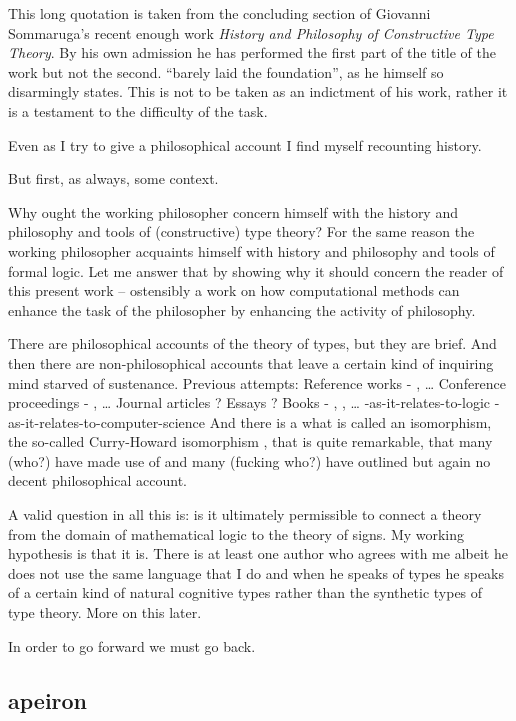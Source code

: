 \documentclass[dah,phd,a4paper]{xe_uccthesis}
\newcommand{\work}[1] {\textit{#1}}
\begin{document}
This long quotation is taken from the concluding section of Giovanni Sommaruga's recent enough work \work{History and Philosophy of Constructive Type Theory}. By his own admission he has performed the first part of the title of the work but not the second. “barely laid the foundation”, as he himself so disarmingly states. This is not to be taken as an indictment of his work, rather it is a testament to the difficulty of the task.

Even as I try to give a philosophical account I find myself recounting history.

But first, as always, some context.

Why ought the working philosopher concern himself with the history and philosophy and tools of (constructive) type theory? For the same reason the working philosopher acquaints himself with history and philosophy and tools of formal logic. Let me answer that by showing why it should concern the reader of this present work – ostensibly a work on how computational methods can enhance the task of the philosopher by enhancing the activity of philosophy.

There are philosophical accounts of the theory of types, but they are brief. And then there are non-philosophical accounts that leave a certain kind of inquiring mind starved of sustenance.
Previous attempts:
Reference works - \citep{coquand_type_2015}, …
Conference proceedings - \citep{martin-lof_hilbert-brouwer_2008}, …
Journal articles ?
Essays ?
Books - \citep{harper_practical_2016}, \citep{pierce_types_2002}, …
-as-it-relates-to-logic
-as-it-relates-to-computer-science
And there is a what is called an isomorphism, the so-called Curry-Howard isomorphism \citep{sorensen_lectures_2007}, that is quite remarkable, that many (who?) have made use of and many (fucking who?) have outlined but again no decent philosophical account.

A valid question in all this is: is it ultimately permissible to connect a theory from the domain of mathematical logic to the theory of signs. My working hypothesis is that it is. There is at least one author who agrees with me albeit he does not use the same language that I do and when he speaks of types he speaks of a certain kind of natural cognitive types rather than the synthetic types of type theory. More on this later. 

In order to go forward we must go back.

\subsection{apeiron}
\end{document}
